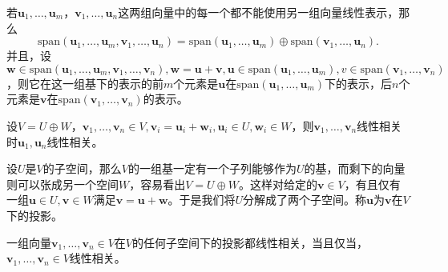 若$\boldsymbol{u}_1, \ldots, \boldsymbol{u}_m$，$\boldsymbol{v}_1, \ldots, \boldsymbol{u}_n$这两组向量中的每一个都不能使用另一组向量线性表示，那么
\[
\mathrm{span}(\boldsymbol{u}_1, \ldots, \boldsymbol{u}_m, \boldsymbol{v}_1, \ldots, \boldsymbol{u}_n) = \mathrm{span}(\boldsymbol{u}_1, \ldots, \boldsymbol{u}_m) \oplus \mathrm{span}(\boldsymbol{v}_1, \ldots, \boldsymbol{u}_n).
\]
并且，设$\boldsymbol{w} \in \mathrm{span}(\boldsymbol{u}_1, \ldots, \boldsymbol{u}_m, \boldsymbol{v}_1, \ldots, \boldsymbol{v}_n), \boldsymbol{w} = \boldsymbol{u} + \boldsymbol{v}, \boldsymbol{u} \in \mathrm{span}(\boldsymbol{u}_1, \ldots, \boldsymbol{u}_m), v \in \mathrm{span}(\boldsymbol{v}_1, \ldots, \boldsymbol{v}_n)$，则它在这一组基下的表示的前$m$个元素是$\boldsymbol{u}$在$\mathrm{span}(\boldsymbol{u}_1, \ldots, \boldsymbol{u}_m)$下的表示，后$n$个元素是$\boldsymbol{v}$在$\mathrm{span}(\boldsymbol{v}_1, \ldots, \boldsymbol{v}_n)$的表示。

设$V=U\oplus W$，$\boldsymbol{v}_1, \ldots, \boldsymbol{v}_n \in V, \boldsymbol{v}_i = \boldsymbol{u}_i + \boldsymbol{w}_i, \boldsymbol{u}_i \in U, \boldsymbol{w}_i \in W$，则$\boldsymbol{v}_1, \ldots, \boldsymbol{v}_n$线性相关时$\boldsymbol{u}_1, \boldsymbol{u}_n$线性相关。

设$U$是$V$的子空间，那么$V$的一组基一定有一个子列能够作为$U$的基，而剩下的向量则可以张成另一个空间$W$，容易看出$V=U \oplus W$。这样对给定的$\boldsymbol{v} \in V$，有且仅有一组$\boldsymbol{u}\in U, \boldsymbol{v} \in W$满足$\boldsymbol{v} = \boldsymbol{u} + \boldsymbol{w}$。于是我们将$U$分解成了两个子空间。称$\boldsymbol{u}$为$\boldsymbol{v}$在$V$下的投影。

一组向量$\boldsymbol{v}_1, \ldots, \boldsymbol{v}_n \in V$在$V$的任何子空间下的投影都线性相关，当且仅当，$\boldsymbol{v}_1, \ldots, \boldsymbol{v}_n \in V$线性相关。
